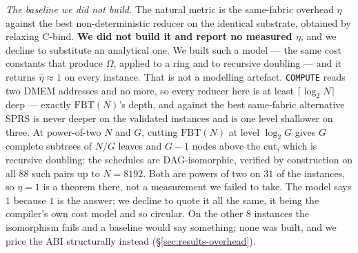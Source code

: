 \documentclass[journal,10pt]{IEEEtran}
\theoremstyle{plain}
\theoremstyle{definition}
\theoremstyle{remark}
\newcommand{\FBT}{\ensuremath{\mathrm{FBT}}}
\newcommand{\sprs}{\textsc{SPRS}}
\begin{document}
\emph{The baseline we did not build.} The natural metric is the same-fabric
overhead $\eta$ against the best non-deterministic reducer on the identical
substrate, obtained by relaxing \textsf{C-bind}. \textbf{We did not build it
and report no measured $\eta$}, and we decline to substitute an analytical
one. We built such a model --- the same cost constants that produce $\Omega$,
applied to a ring and to recursive doubling --- and it returns
$\hat\eta \approx 1$ on every instance. That is not a modelling artefact.
\texttt{COMPUTE} reads two DMEM addresses and no more, so every reducer here
is at least $\lceil\log_2 N\rceil$ deep --- exactly $\FBT(N)$'s depth, and
against the best same-fabric alternative \sprs{} is never deeper on the
\TournNInst{} validated instances and is one level shallower on three. At
power-of-two $N$ and $G$, cutting $\FBT(N)$ at level $\log_2 G$ gives $G$
complete subtrees of $N/G$ leaves and $G-1$ nodes above the cut, which is
recursive doubling: the schedules are DAG-isomorphic, verified by construction
on all $88$ such pairs up to $N = 8192$. Both are powers of two on $31$ of the
\TournNInst{} instances, so $\eta = 1$ is a theorem there, not a measurement
we failed to take. The model says $1$ because $1$ is the answer; we decline to
quote it all the same, it being the compiler's own cost model and so circular.
On the other $8$ instances the isomorphism fails and a baseline would say
something; none was built, and we price the ABI structurally instead
(\S\ref{sec:results-overhead}).


\end{document}
